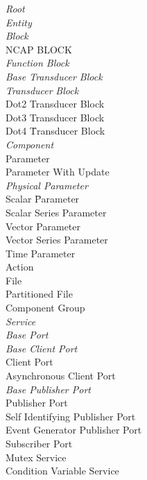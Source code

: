 \begin{tabbing}
\textit{Root} \= \\
\> \textit{Entity} \= \\
\> \> \textit{Block} \= \\
\> \> \> NCAP BLOCK \\
\> \> \> \textit{Function Block} \\
\> \> \> \textit{Base Transducer Block} \\
\> \> \> \textit{Transducer} \= \textit{Block} \\
\> \> \> \> Dot2 Transducer Block \\
\> \> \> \> Dot3 Transducer Block \\
\> \> \> \> Dot4 \= Transducer Block \\
\> \> \textit{Component} \\
\> \> \> Parameter \\
\> \> \> \> Parameter With Update \\
\> \> \> \> \> \= \textit{Physical Parameter} \\
\> \> \> \> \> \> Scalar \= Parameter \\
\> \> \> \> \> \> \> Scalar Series Parameter \\
\> \> \> \> \> \> Vector Parameter \\
\> \> \> \> \> \> \> Vector Series Parameter \\
\> \> \> \> Time Parameter \\
\> \> \> Action \\
\> \> \> File \\
\> \> \> \> Partitioned File \\
\> \> \> Component Group \\
\> \> \textit{Service} \\
\> \> \> \textit{Base Port} \\
\> \> \> \> \textit{Base Client Port} \\
\> \> \> \> \> Client Port \\
\> \> \> \> \> Asynchronous Client Port \\
\> \> \> \> \textit{Base Publisher Port} \\
\> \> \> \> \> Publisher Port \\
\> \> \> \> \> Self Identifying Publisher Port \\
\> \> \> \> \> \> \> Event Generator Publisher Port \\
\> \> \> Subscriber Port \\
\> \> \> Mutex Service \\
\> \> \> Condition Variable Service \\
\end{tabbing}

